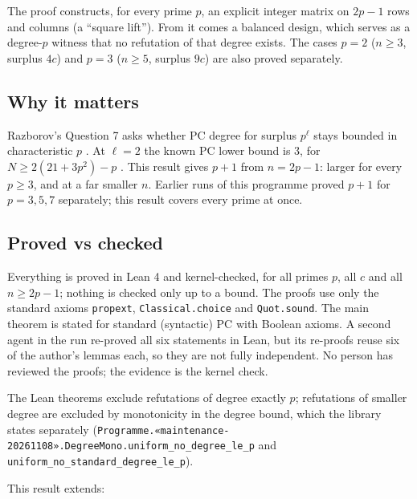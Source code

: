 \documentclass{article}
\begin{document}
The proof constructs, for every prime $p$, an explicit integer matrix on $2p-1$ rows and columns
(a ``square lift''). From it comes a balanced design, which serves as a degree-$p$ witness that no
refutation of that degree exists. The cases $p=2$ ($n\ge3$, surplus $4c$) and $p=3$ ($n\ge5$,
surplus $9c$) are also proved separately.

\subsection*{Why it matters}

Razborov's Question 7 asks whether PC degree for surplus $p^\ell$ stays bounded in characteristic
$p$ \cite{razborov2001php}. At $\ell=2$ the known PC lower bound is $3$, for
$N\ge2(21+3p^2)-p$ \cite{riis1997nonconstant}. This result gives $p+1$ from $n=2p-1$: larger for every
$p\ge3$, and at a far smaller $n$. Earlier runs of this programme proved $p+1$ for $p=3,5,7$
separately; this result covers every prime at once.

\subsection*{Proved vs checked}

Everything is proved in Lean 4 and kernel-checked, for all primes $p$, all $c$ and all
$n\ge2p-1$; nothing is checked only up to a bound. The proofs use only the standard axioms
\texttt{propext}, \texttt{Classical.choice} and \texttt{Quot.sound}. The main theorem is stated for standard
(syntactic) PC with Boolean axioms. A second agent in the run re-proved all six statements in Lean, but its
re-proofs reuse six of the author's lemmas each, so they are not fully independent. No person has
reviewed the proofs; the evidence is the kernel check.

The Lean theorems exclude refutations of degree exactly $p$; refutations of smaller degree are excluded by
monotonicity in the degree bound, which the library states separately
(\texttt{Programme.«maintenance-20261108».DegreeMono.uniform\_no\_degree\_le\_p} and \texttt{uniform\_no\_standard\_degree\_le\_p}).

This result extends:
\end{document}
